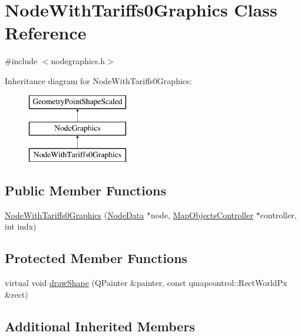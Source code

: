\hypertarget{class_node_with_tariffs0_graphics}{}\section{Node\+With\+Tariffs0\+Graphics Class Reference}
\label{class_node_with_tariffs0_graphics}


{\ttfamily \#include $<$nodegraphics.\+h$>$}

Inheritance diagram for Node\+With\+Tariffs0\+Graphics\+:\begin{figure}[H]
\begin{center}
\leavevmode
\includegraphics[height=3.000000cm]{d1/ddc/class_node_with_tariffs0_graphics}
\end{center}
\end{figure}
\subsection*{Public Member Functions}
\begin{DoxyCompactItemize}
\item 
\mbox{\hyperlink{class_node_with_tariffs0_graphics_a6cc528a84667ebc35afe881e16417b89}{Node\+With\+Tariffs0\+Graphics}} (\mbox{\hyperlink{class_node_data}{Node\+Data}} $\ast$node, \mbox{\hyperlink{class_map_objects_controller}{Map\+Objects\+Controller}} $\ast$controller, int indx)
\end{DoxyCompactItemize}
\subsection*{Protected Member Functions}
\begin{DoxyCompactItemize}
\item 
virtual void \mbox{\hyperlink{class_node_with_tariffs0_graphics_a63909073db786886a6b5c57bca9f875d}{draw\+Shape}} (Q\+Painter \&painter, const qmapcontrol\+::\+Rect\+World\+Px \&rect)
\end{DoxyCompactItemize}
\subsection*{Additional Inherited Members}


